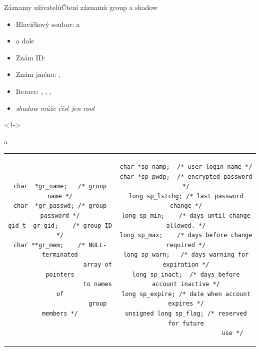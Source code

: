 \begin{frame}[fragile]{Záznamy uživatelů}{Čtení záznamů group a shadow}

  \begin{itemize}
    \item Hlavičkový soubor:  a 
    \item {} a  dole

    \pause

    \item Znám ID: 
    \item Znám jméno: , 

    \pause

    \item Iterace: , , ,

    \pause

    \item \emph{shadow může číst jen root}
  \end{itemize}

  \begin{uncoverenv}<1->
  \begin{block}{ a }
  \begin{tabular}{c|c}
  \begin{lstlisting}
char  *gr_name;   /* group name */
char  *gr_passwd; /* group password */
gid_t  gr_gid;    /* group ID */
char **gr_mem;    /* NULL-terminated
                     array of pointers
                     to names of
                     group members */
  \end{lstlisting} &
  \begin{lstlisting}
char *sp_namp;  /* user login name */
char *sp_pwdp;  /* encrypted password */
long sp_lstchg; /* last password change */
long sp_min;    /* days until change allowed. */
long sp_max;    /* days before change required */
long sp_warn;   /* days warning for expiration */
long sp_inact;  /* days before account inactive */
long sp_expire; /* date when account expires */
unsigned long sp_flag; /* reserved for future
                          use */
  \end{lstlisting}
  \end{tabular}
  \end{block}
  \end{uncoverenv}

\end{frame}

